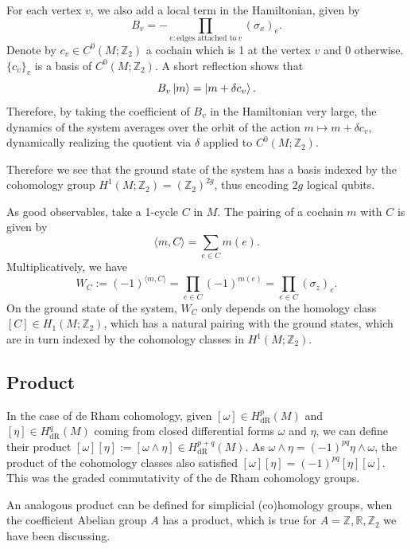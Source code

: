\documentclass[12pt]{article}
\numberwithin{equation}{section}
\numberwithin{figure}{section}
\theoremstyle{remark}
\def\bR{\mathbb{R}}
\def\bZ{\mathbb{Z}}
\begin{document}
For each vertex $v$, we also add a local term in the Hamiltonian,
given by 
\begin{equation}
  B_v=-\prod_{e: \text{edges attached to}\ v} (\sigma_x)_e.
\end{equation}
Denote by $c_v\in C^0(M;\bZ_2)$ 
a cochain which is 1 at the vertex $v$ and 0 otherwise.
$\{c_v\}_v$ is a basis of $C^0(M;\bZ_2)$.
A short reflection shows that \begin{equation}
B_v \ket{m} = \ket{m+\delta c_v}.
\end{equation}
Therefore, by taking the coefficient of $B_v$ in the Hamiltonian very large,
the dynamics of the system averages over the orbit of the action $m\mapsto m+\delta c_v$,
dynamically realizing the quotient via $\delta$ applied to $C^0(M;\bZ_2)$.

Therefore we see that the ground state of the system has a basis indexed by the cohomology group $H^1(M;\bZ_2)=(\bZ_2)^{2g}$,
thus encoding $2g$ logical qubits.

As good observables, take a 1-cycle $C$ in $M$.
The pairing of a cochain $m$ with $C$ is given by \begin{equation}
\langle m,C\rangle = \sum_{e\in C} m(e).
\end{equation} Multiplicatively, we have \begin{equation}
W_C:= (-1)^{\langle m,C\rangle} = \prod_{e\in C} (-1)^{m(e)} = \prod_{e \in C} (\sigma_z)_e.
\end{equation}
On the ground state of the system, $W_C$ only depends on the homology class $[C]\in H_1(M;\bZ_2)$,
which has a natural pairing with the ground states,
which are in turn indexed by the cohomology classes in  $H^1(M;\bZ_2)$.

\subsection{Product}

In the case of de Rham cohomology, 
given $[\omega]\in H^p_\text{dR}(M)$ and $[\eta]\in H^q_\text{dR}(M)$ coming from
closed differential forms $\omega$ and $\eta$,
we can define their product $[\omega][\eta] := [\omega \wedge \eta]\in H^{p+q}_\text{dR}(M)$.
As $\omega\wedge \eta=(-1)^{pq}\eta\wedge\omega$,
the product of the cohomology classes also satisfied 
$[\omega] [\eta]=(-1)^{pq}[\eta] [\omega]$.
This was the graded commutativity of the de Rham cohomology groups.

An analogous product can be defined for simplicial (co)homology groups, when the coefficient Abelian group $A$ has a product,
 which is true for $A=\bZ,\bR,\bZ_2$ we have been discussing.
\end{document}
